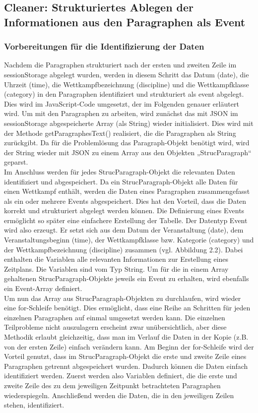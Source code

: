 \subsection{Cleaner: Strukturiertes Ablegen der Informationen aus den Paragraphen als Event}

\subsubsection{Vorbereitungen für die Identifizierung der Daten}
Nachdem die Paragraphen strukturiert nach der ersten und zweiten Zeile im sessionStorage abgelegt wurden, werden in diesem Schritt das Datum (date), die Uhrzeit (time), die Wettkampfbezeichnung (discipline) und die Wettkampfklasse (category) in den Paragraphen identifiziert und strukturiert als event abgelegt.\\
Dies wird im JavaScript-Code umgesetzt, der im Folgenden genauer erläutert wird. Um mit den Paragraphen zu arbeiten, wird zunächst das mit JSON im sessionStorage abgespeicherte Array (als String) wieder initialisiert. Dies wird mit der Methode getParagraphesText() realisiert, die die Paragraphen als String zurückgibt. Da für die Problemlösung das Paragraph-Objekt benötigt wird, wird der String wieder mit \ac{JSON} zu einem Array aus den Objekten „StrucParagraph“ geparst.\\
Im Anschluss werden für jedes StrucParagraph-Objekt die relevanten Daten identifiziert und abgespeichert. Da ein StrucParagraph-Objekt alle Daten für einen Wettkampf enthält, werden die Daten eines Paragraphen zusammengefasst als ein oder mehrere Events abgespeichert. Dies hat den Vorteil, dass die Daten korrekt und strukturiert abgelegt werden können. Die Definierung eines Events ermöglicht so später eine einfachere Erstellung der Tabelle. Der Datentyp Event wird also erzeugt. Er setzt sich aus dem Datum der Veranstaltung (date), dem Veranstaltungsbeginn (time), der Wettkampfklasse bzw. Kategorie (category) und der Wettkampfbezeichnung (discipline) zusammen (vgl. Abbildung 2.2). Dabei enthalten die Variablen alle relevanten Informationen zur Erstellung eines Zeitplans. Die Variablen sind vom Typ String. Um für die in einem Array gehaltenen StrucParagraph-Objekte jeweils ein Event zu erhalten, wird ebenfalls ein Event-Array definiert.\\
Um nun das Array aus StrucParagraph-Objekten zu durchlaufen, wird wieder eine for-Schleife benötigt. Dies ermöglicht, dass eine Reihe an Schritten für jeden einzelnen Paragraphen auf einmal umgesetzt werden kann. Die einzelnen Teilprobleme nicht auszulagern erscheint zwar unübersichtlich, aber diese Methodik erlaubt gleichzeitig, dass man im Verlauf die Daten in der Kopie (z.B. von der ersten Zeile) einfach verändern kann. 
Am Beginn der for-Schleife wird der Vorteil genutzt, dass im StrucParagraph-Objekt die erste und zweite Zeile eines Paragraphen getrennt abgespeichert wurden. Dadurch können die Daten einfach identifiziert werden. Zuerst werden also Variablen definiert, die die erste und zweite Zeile des zu dem jeweiligen Zeitpunkt betrachteten Paragraphen wiederspiegeln. Anschließend werden die Daten, die in den jeweiligen Zeilen stehen, identifiziert.

